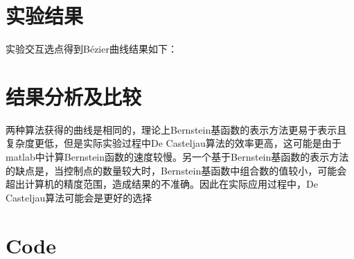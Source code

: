 \documentclass[12pt]{article}
\begin{document}
\section{实验结果}
实验交互选点得到Bézier曲线结果如下：
\begin{figure}[htb]
\end{figure}

\section{结果分析及比较}
两种算法获得的曲线是相同的，理论上Bernstein基函数的表示方法更易于表示且复杂度更低，但是实际实验过程中De Casteljau算法的效率更高，这可能是由于matlab中计算Bernstein函数的速度较慢。另一个基于Bernstein基函数的表示方法的缺点是，当控制点的数量较大时，Bernstein基函数中组合数的值较小，可能会超出计算机的精度范围，造成结果的不准确。因此在实际应用过程中，De Casteljau算法可能会是更好的选择

\appendix
\section{Code}
\end{document}
